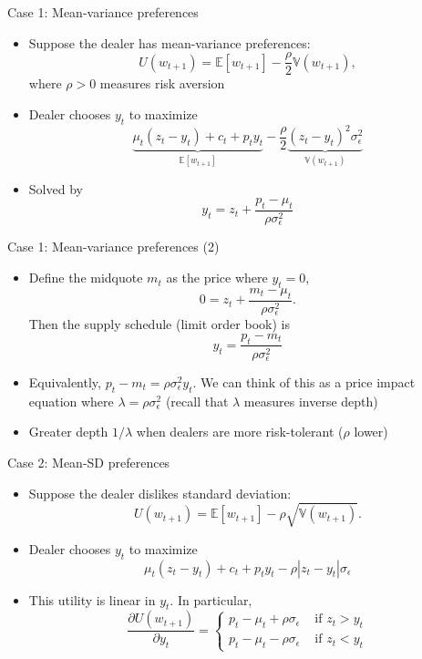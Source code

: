 \documentclass[english,10pt]{beamer}
\begin{document}
\begin{frame}{Case 1: Mean-variance preferences}
	\begin{itemize}
		\item Suppose the dealer has mean-variance preferences:
		\[
		U(w_{t+1})=\mathbb{E}[w_{t+1}] - \frac{\rho}{2} \mathbb{V}(w_{t+1}),
		\]
		where $\rho>0$ measures risk aversion
		\item Dealer chooses $y_t$ to maximize
		\[
		\underbrace{\mu_t(z_t-y_t) + c_t + p_t y_t}_{\mathbb{E}[w_{t+1}] } - \frac{\rho}{2} \underbrace{(z_t -y_t)^2 \sigma^2_\epsilon}_{ \mathbb{V}(w_{t+1})}
		\]
		\item Solved by 
			\[
			y_t = z_t + \frac{p_t-\mu_t}{\rho \sigma^2_\epsilon}
			\]
	\end{itemize}
\end{frame}


\begin{frame}{Case 1: Mean-variance preferences (2)}
	\begin{itemize}
		\item Define the midquote $m_t$ as the price where $y_t=0$,
		\[
		0 = z_t + \frac{m_t-\mu_t}{\rho \sigma^2_\epsilon}.
		\]
		Then the supply schedule (limit order book) is 
		\[
		y_t = \frac{p_t - m_t}{\rho \sigma^2_\epsilon}
		\]
		\item Equivalently, $p_t-m_t=\rho \sigma^2_\epsilon y_t$. We can think of this as a price impact equation where $\lambda=\rho \sigma^2_\epsilon$ (recall that $\lambda$ measures inverse depth)
		\item Greater depth $1/\lambda$ when dealers are more risk-tolerant ($\rho$ lower)
	\end{itemize}
\end{frame}


\begin{frame}{Case 2: Mean-SD preferences}
	\begin{itemize}
		\item Suppose the dealer dislikes standard deviation:
		\[
		U(w_{t+1})=\mathbb{E}[w_{t+1}] - \rho \sqrt{\mathbb{V}(w_{t+1})}.
		\]
		\item Dealer chooses $y_t$ to maximize
		\[
		\mu_t (z_t - y_t) + c_t + p_t y_t - \rho |z_t - y_t|\sigma_\epsilon
		\]
		\item This utility is linear in $y_t$. In particular,
		\[
		\frac{\partial U(w_{t+1})}{\partial y_t}= \left\{
		\begin{aligned}
		p_t-\mu_t+\rho\sigma_{\epsilon}	& \text{ if } z_t>y_t \\
		p_t-\mu_t-\rho\sigma_{\epsilon}	& \text{ if } z_t<y_t 
		\end{aligned}
		\right.
		\]
	\end{itemize}
\end{frame}
\end{document}
